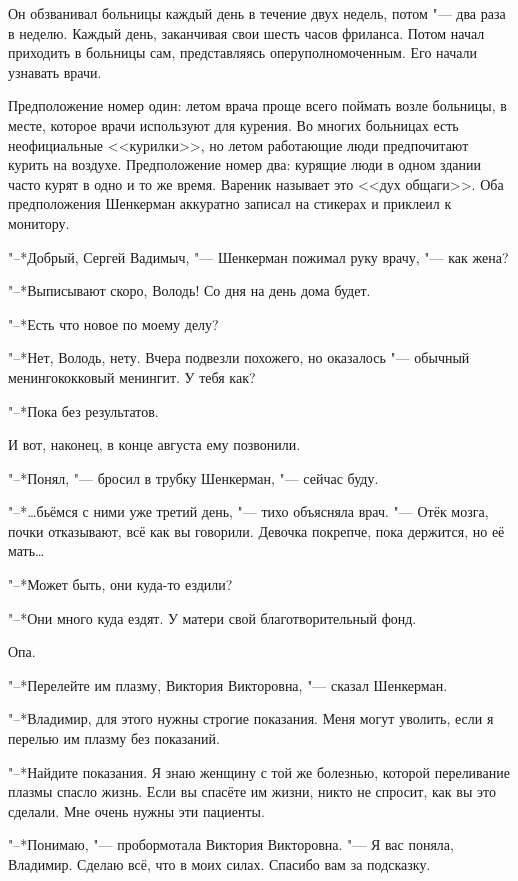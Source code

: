 Он обзванивал больницы каждый день в течение двух недель, потом "--- два раза в неделю.
Каждый день, заканчивая свои шесть часов фриланса.
Потом начал приходить в больницы сам, представляясь оперуполномоченным.
Его начали узнавать врачи.

Предположение номер один: летом врача проще всего поймать возле больницы, в месте, которое врачи используют для курения.
Во многих больницах есть неофициальные <<курилки>>, но летом работающие люди предпочитают курить на воздухе.
Предположение номер два: курящие люди в одном здании часто курят в одно и то же время.
Вареник называет это <<дух общаги>>.
Оба предположения Шенкерман аккуратно записал на стикерах и приклеил к монитору.

"--*Добрый, Сергей Вадимыч, "--- Шенкерман пожимал руку врачу, "--- как жена?

"--*Выписывают скоро, Володь!
Со дня на день дома будет.

"--*Есть что новое по моему делу?

"--*Нет, Володь, нету.
Вчера подвезли похожего, но оказалось "--- обычный менингококковый менингит.
У тебя как?

"--*Пока без результатов.

И вот, наконец, в конце августа ему позвонили.

\label{Fri_2012_08_24}

"--*Понял, "--- бросил в трубку Шенкерман, "--- сейчас буду.

"--*\ldots{}бьёмся с ними уже третий день, "--- тихо объясняла врач.
"--- Отёк мозга, почки отказывают, всё как вы говорили.
Девочка покрепче, пока держится, но её мать\ldots{}

"--*Может быть, они куда-то ездили?

"--*Они много куда ездят.
У матери свой благотворительный фонд.

Опа.

"--*Перелейте им плазму, Виктория Викторовна, "--- сказал Шенкерман.

"--*Владимир, для этого нужны строгие показания.
Меня могут уволить, если я перелью им плазму без показаний.

"--*Найдите показания.
Я знаю женщину с той же болезнью, которой переливание плазмы спасло жизнь.
Если вы спасёте им жизни, никто не спросит, как вы это сделали.
Мне очень нужны эти пациенты.

"--*Понимаю, "--- пробормотала Виктория Викторовна.
"--- Я вас поняла, Владимир.
Сделаю всё, что в моих силах.
Спасибо вам за подсказку.


